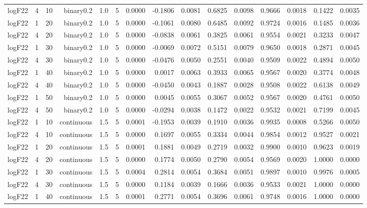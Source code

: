 \begin{longtable}{rrrrrrrrrrrrrrr}
  logF22 & 4 & 10 & binary0.2 & 1.0 & 5 & 0.0000 & -0.1806 & 0.0081 & 0.6825 & 0.0098 & 0.9666 & 0.0018 & 0.1422 & 0.0035 \\ 
  logF22 & 1 & 20 & binary0.2 & 1.0 & 5 & 0.0000 & -0.1061 & 0.0080 & 0.6485 & 0.0092 & 0.9724 & 0.0016 & 0.1485 & 0.0036 \\ 
  logF22 & 4 & 20 & binary0.2 & 1.0 & 5 & 0.0000 & -0.0838 & 0.0061 & 0.3825 & 0.0061 & 0.9554 & 0.0021 & 0.3233 & 0.0047 \\ 
  logF22 & 1 & 30 & binary0.2 & 1.0 & 5 & 0.0000 & -0.0069 & 0.0072 & 0.5151 & 0.0079 & 0.9650 & 0.0018 & 0.2871 & 0.0045 \\ 
  logF22 & 4 & 30 & binary0.2 & 1.0 & 5 & 0.0000 & -0.0476 & 0.0050 & 0.2551 & 0.0040 & 0.9509 & 0.0022 & 0.4894 & 0.0050 \\ 
  logF22 & 1 & 40 & binary0.2 & 1.0 & 5 & 0.0000 & 0.0017 & 0.0063 & 0.3933 & 0.0065 & 0.9567 & 0.0020 & 0.3774 & 0.0048 \\ 
  logF22 & 4 & 40 & binary0.2 & 1.0 & 5 & 0.0000 & -0.0450 & 0.0043 & 0.1887 & 0.0028 & 0.9508 & 0.0022 & 0.6138 & 0.0049 \\ 
  logF22 & 1 & 50 & binary0.2 & 1.0 & 5 & 0.0000 & 0.0045 & 0.0055 & 0.3067 & 0.0052 & 0.9567 & 0.0020 & 0.4761 & 0.0050 \\ 
  logF22 & 4 & 50 & binary0.2 & 1.0 & 5 & 0.0000 & -0.0294 & 0.0038 & 0.1472 & 0.0022 & 0.9532 & 0.0021 & 0.7199 & 0.0045 \\ 
  logF22 & 1 & 10 & continuous & 1.5 & 5 & 0.0001 & -0.1953 & 0.0039 & 0.1910 & 0.0036 & 0.9935 & 0.0008 & 0.5266 & 0.0050 \\ 
  logF22 & 4 & 10 & continuous & 1.5 & 5 & 0.0000 & 0.1697 & 0.0055 & 0.3334 & 0.0044 & 0.9854 & 0.0012 & 0.9527 & 0.0021 \\ 
  logF22 & 1 & 20 & continuous & 1.5 & 5 & 0.0001 & 0.1881 & 0.0049 & 0.2719 & 0.0032 & 0.9900 & 0.0010 & 0.9623 & 0.0019 \\ 
  logF22 & 4 & 20 & continuous & 1.5 & 5 & 0.0000 & 0.1774 & 0.0050 & 0.2790 & 0.0054 & 0.9569 & 0.0020 & 1.0000 & 0.0000 \\ 
  logF22 & 1 & 30 & continuous & 1.5 & 5 & 0.0004 & 0.2814 & 0.0054 & 0.3684 & 0.0051 & 0.9897 & 0.0010 & 0.9976 & 0.0005 \\ 
  logF22 & 4 & 30 & continuous & 1.5 & 5 & 0.0000 & 0.1184 & 0.0039 & 0.1666 & 0.0036 & 0.9533 & 0.0021 & 1.0000 & 0.0000 \\ 
  logF22 & 1 & 40 & continuous & 1.5 & 5 & 0.0001 & 0.2771 & 0.0054 & 0.3696 & 0.0061 & 0.9748 & 0.0016 & 1.0000 & 0.0000 \\ 

\end{longtable}
